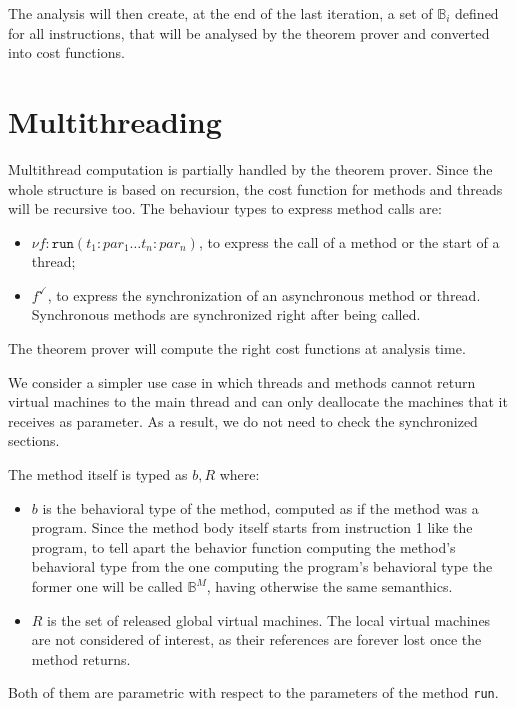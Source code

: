 \documentclass{amsart}
\newcommand{\bB}[1]{\mathbb{B}_{#1}}
\numberwithin{equation}{section}
\theoremstyle{plain} %
\theoremstyle{definition}
\theoremstyle{remark}
\begin{document}
The analysis will then create, at the end of the last iteration, a set of $\bB{i}$ defined for all instructions, that will be analysed by the theorem prover and converted into cost functions.
\pagebreak
\section{Multithreading}
Multithread computation is partially handled by the theorem prover. Since the whole structure is based on recursion, the cost function for methods and threads will be recursive too. The behaviour types to express method calls are:
\begin{itemize}
\item $\nu f:\texttt{run}(t_1:par_1 \dots t_n:par_n)$, to express the call of a method or the start of a thread;
\item $f^\checkmark$, to express the synchronization of an asynchronous method or thread. Synchronous methods are synchronized right after being called.
\end{itemize}
The theorem prover will compute the right cost functions at analysis time.

We consider a simpler use case in which threads and methods cannot return virtual machines to the main thread and can only deallocate the machines that it receives as parameter. As a result, we do not need to check the synchronized sections.

The method itself is typed as $b, R$ where:
\begin{itemize}
\item $b$ is the behavioral type of the method, computed as if the method was a program. Since the method body itself starts from instruction 1 like the program, to tell apart the behavior function computing the method's behavioral type from the one computing the program's behavioral type the former one will be called $\bB{}^M$, having otherwise the same semanthics.
\item $R$ is the set of released global virtual machines. The local virtual machines are not considered of interest, as their references are forever lost once the method returns.
\end{itemize}
Both of them are parametric with respect to the parameters of the method \texttt{run}.
\end{document}
